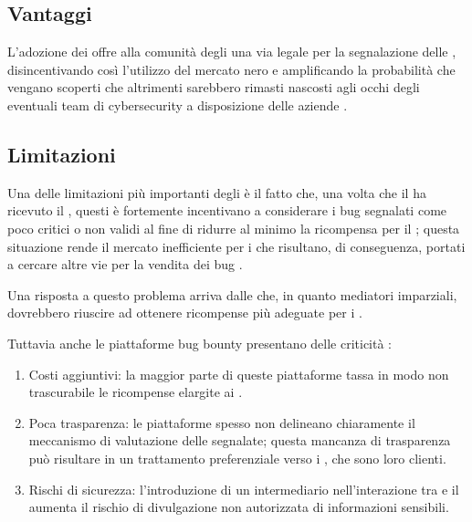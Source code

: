 
\subsection{Vantaggi}

L'adozione dei \BBP offre alla comunità degli \hacker una via legale per la segnalazione delle \vulnerability, disincentivando così l'utilizzo del mercato nero \cite{fryer2017bugbounty, walshe2020bountypaper, walshe2023bountythesis3} e amplificando la probabilità che vengano scoperti \bug che altrimenti sarebbero rimasti nascosti agli occhi degli eventuali team di cybersecurity a disposizione delle aziende \cite{walshe2020bountypaper}.

\subsection{Limitazioni}

\medskip

Una delle limitazioni più importanti degli \internalBBP è il fatto che, una volta che il \BI ha ricevuto il \bugreport, questi è fortemente incentivano a considerare i bug segnalati come poco critici o non validi al fine di ridurre al minimo la ricompensa per il \BH \cite{canidio2021verioss, akgul2023bughunters}; questa situazione rende il mercato inefficiente per i \BH che risultano, di conseguenza, portati a cercare altre vie per la vendita dei bug \cite{canidio2021verioss}.

\medskip

Una risposta a questo problema arriva dalle \bugbountyplatform che, in quanto mediatori imparziali, dovrebbero riuscire ad ottenere ricompense più adeguate per i \BH \cite{canidio2021verioss, akgul2023bughunters}. 

\medskip

Tuttavia anche le piattaforme bug bounty presentano delle criticità \cite{badash2021blockbounty}:
\begin{enumerate}

\item Costi aggiuntivi: la maggior parte di queste piattaforme tassa in modo non trascurabile le ricompense elargite ai \BH.

\item Poca trasparenza: le piattaforme spesso non delineano chiaramente il meccanismo di valutazione delle \vulnerability segnalate; questa mancanza di trasparenza può risultare in un trattamento preferenziale verso i \BI, che sono loro clienti.

\item Rischi di sicurezza: l'introduzione di un intermediario nell'interazione tra \BI e il \BH aumenta il rischio di divulgazione non autorizzata di informazioni sensibili.

\end{enumerate}

